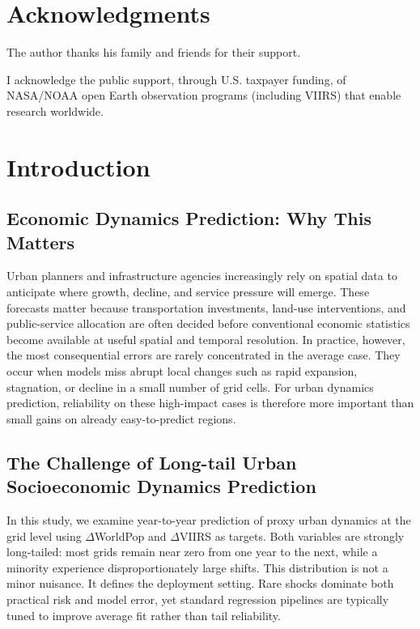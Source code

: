 \documentclass[pdflatex,sn-basic,Numbered]{sn-jnl}
\begin{document}
\section*{Acknowledgments}

The author thanks his family and friends for their support.

I acknowledge the public support, through U.S. taxpayer funding, of NASA/NOAA open Earth observation programs (including VIIRS) that enable research worldwide.




\section{Introduction}

\subsection{Economic Dynamics Prediction: Why This Matters}
Urban planners and infrastructure agencies increasingly rely on spatial data to anticipate where growth, decline, and service pressure will emerge. These forecasts matter because transportation investments, land-use interventions, and public-service allocation are often decided before conventional economic statistics become available at useful spatial and temporal resolution. In practice, however, the most consequential errors are rarely concentrated in the average case. They occur when models miss abrupt local changes such as rapid expansion, stagnation, or decline in a small number of grid cells. For urban dynamics prediction, reliability on these high-impact cases is therefore more important than small gains on already easy-to-predict regions.

\subsection{The Challenge of Long-tail Urban Socioeconomic Dynamics Prediction}

In this study, we examine year-to-year prediction of proxy urban dynamics at the grid level using $\Delta$WorldPop and $\Delta$VIIRS as targets. Both variables are strongly long-tailed: most grids remain near zero from one year to the next, while a minority experience disproportionately large shifts. This distribution is not a minor nuisance. It defines the deployment setting. Rare shocks dominate both practical risk and model error, yet standard regression pipelines are typically tuned to improve average fit rather than tail reliability.
\end{document}
